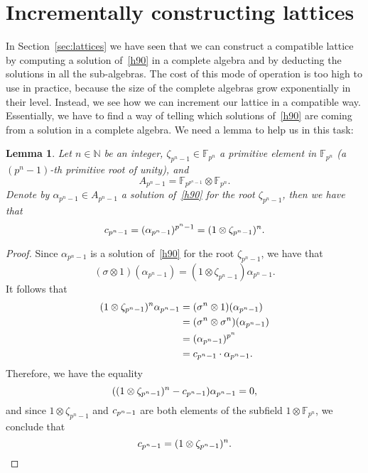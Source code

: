 \documentclass{sig-alternate}
\newtheorem{lemma}{Lemma}
\begin{document}
\section{Incrementally constructing lattices}
\label{sec:construction}
In Section~\ref{sec:lattices} we have seen that we can construct a compatible
lattice by computing a solution of~\eqref{h90} in a complete algebra and
by deducting the solutions in all the sub-algebras. The cost of this mode of
operation is too high to use in practice, because the size of the complete
algebras grow exponentially in their level. Instead, we see how we can
increment our lattice in a compatible way.
Essentially, we have to find a way of telling which solutions of~\eqref{h90} are
coming from a solution in a complete algebra. We need a lemma to help us in this task:
\begin{lemma}
  \label{lemma:formula}
  Let $n\in\mathbb{N}$ be an integer, $\zeta_{p^n-1}\in\mathbb{F}_{p^n}$ a
  primitive element in $\mathbb{F}_{p^n}$ (a $(p^n-1)$-th primitive root of
  unity), and
  \[
    A_{p^n-1} = \mathbb{F}_{p^{p^n-1}}\otimes\mathbb{F}_{p^n}.
  \]
  Denote by $\alpha_{p^n-1}\in A_{p^{n}-1}$ a solution of~\eqref{h90} for the
  root $\zeta_{p^n-1}$, then we have that
  \[
    c_{p^n-1} = (\alpha_{p^n-1})^{p^n-1} = (1\otimes\zeta_{p^n-1})^n.
  \]
\end{lemma}
\begin{proof}
  Since $\alpha_{p^n-1}$ is a solution of~\eqref{h90} for the root
  $\zeta_{p^n-1}$, we have that
  \[
    (\sigma\otimes 1)(\alpha_{p^n-1}) =
    (1\otimes\zeta_{p^n-1})\alpha_{p^n-1}.
  \]
  It follows that
  \begin{align*}
    (1\otimes\zeta_{p^n-1})^n \alpha_{p^n-1} &= (\sigma^n\otimes1)(\alpha_{p^n-1})\\
    &= (\sigma^n\otimes\sigma^n)(\alpha_{p^n-1})\\
    &= (\alpha_{p^n-1})^{p^n}\\
    &= c_{p^n-1}\cdot\alpha_{p^n-1}.
  \end{align*}
  Therefore, we have the equality
  \[
    ( (1\otimes\zeta_{p^n-1})^n - c_{p^n-1})\alpha_{p^n-1} = 0,
  \]
  and since $1\otimes\zeta_{p^n-1}$ and $c_{p^n-1}$ are both elements of the
  subfield $1\otimes\mathbb{F}_{p^n}$, we conclude that
  \[
    c_{p^n-1} = (1\otimes\zeta_{p^n-1})^n.
  \]
\end{proof}
\end{document}
